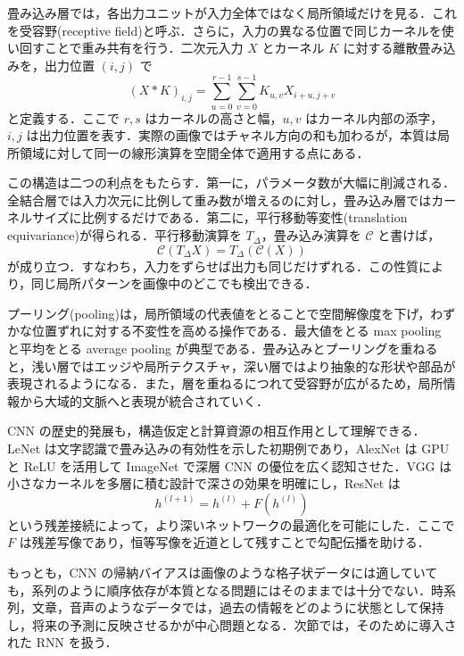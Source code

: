 畳み込み層では，各出力ユニットが入力全体ではなく局所領域だけを見る．これを受容野(receptive field)と呼ぶ．さらに，入力の異なる位置で同じカーネルを使い回すことで重み共有を行う．二次元入力 $X$ とカーネル $K$ に対する離散畳み込みを，出力位置 $(i,j)$ で
\begin{equation}
(X*K)_{i,j}
= \sum_{u=0}^{r-1}\sum_{v=0}^{s-1} K_{u,v}X_{i+u,j+v}
\end{equation}
と定義する．ここで $r,s$ はカーネルの高さと幅，$u,v$ はカーネル内部の添字，$i,j$ は出力位置を表す．実際の画像ではチャネル方向の和も加わるが，本質は局所領域に対して同一の線形演算を空間全体で適用する点にある．

この構造は二つの利点をもたらす．第一に，パラメータ数が大幅に削減される．全結合層では入力次元に比例して重み数が増えるのに対し，畳み込み層ではカーネルサイズに比例するだけである．第二に，平行移動等変性(translation equivariance)が得られる．平行移動演算を $T_\Delta$，畳み込み演算を $\mathcal C$ と書けば，
\begin{equation}
\mathcal C(T_\Delta X)= T_\Delta(\mathcal C(X))
\end{equation}
が成り立つ．すなわち，入力をずらせば出力も同じだけずれる．この性質により，同じ局所パターンを画像中のどこでも検出できる．

プーリング(pooling)は，局所領域の代表値をとることで空間解像度を下げ，わずかな位置ずれに対する不変性を高める操作である．最大値をとる max pooling と平均をとる average pooling が典型である．畳み込みとプーリングを重ねると，浅い層ではエッジや局所テクスチャ，深い層ではより抽象的な形状や部品が表現されるようになる．また，層を重ねるにつれて受容野が広がるため，局所情報から大域的文脈へと表現が統合されていく．

CNN の歴史的発展も，構造仮定と計算資源の相互作用として理解できる．LeNet\cite{LeCun1998} は文字認識で畳み込みの有効性を示した初期例であり，AlexNet\cite{Krizhevsky2012} は GPU と ReLU を活用して ImageNet で深層 CNN の優位を広く認知させた．VGG は小さなカーネルを多層に積む設計で深さの効果を明確にし，ResNet\cite{He2016} は
\begin{equation}
h^{(l+1)} = h^{(l)} + F(h^{(l)})
\end{equation}
という残差接続によって，より深いネットワークの最適化を可能にした．ここで $F$ は残差写像であり，恒等写像を近道として残すことで勾配伝播を助ける．

もっとも，CNN の帰納バイアスは画像のような格子状データには適していても，系列のように順序依存が本質となる問題にはそのままでは十分でない．時系列，文章，音声のようなデータでは，過去の情報をどのように状態として保持し，将来の予測に反映させるかが中心問題となる．次節では，そのために導入された RNN を扱う．

